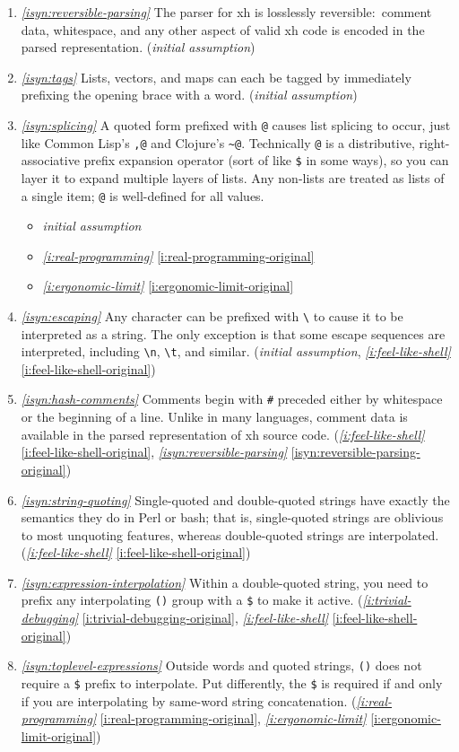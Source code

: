 \documentclass{report}
\makeatletter
\newcommand*{\Label}[2]{%
  \@bsphack
  \begingroup
    \label{#1-original}%
    \def\@currentlabel{#2}%
    \label{#1}%
  \endgroup
  \@esphack
}
\newcommand{\initial}{{\em initial assumption}}
\newcommand{\refboth}[1]{{\em \ref{#1}} \ref{#1-original}}
\makeatother
\begin{document}
\begin{enumerate}
\item{}\Label{isyn:reversible-parsing}{syn.reversibleparsing}{\em\ref{isyn:reversible-parsing}}
  The parser for xh is losslessly reversible:~comment data, whitespace, and
  any other aspect of valid xh code is encoded in the parsed
  representation.
(\initial)
\item{}\Label{isyn:tags}{syn.tags}{\em\ref{isyn:tags}}
  Lists, vectors, and maps can each be tagged by immediately prefixing the
  opening brace with a word.
(\initial)
\item{}\Label{isyn:splicing}{syn.splice}{\em\ref{isyn:splicing}}
  A quoted form prefixed with \verb|@| causes list splicing to occur, just
  like Common Lisp's \verb|,@| and Clojure's \verb|~@|. Technically
  \verb|@| is a distributive, right-associative prefix expansion operator
  (sort of like \verb|$| in some ways), so you can layer it to expand
  multiple layers of lists. Any non-lists are treated as lists of a single
  item; \verb|@| is well-defined for all values.
\begin{itemize}
\item \initial
\item \refboth{i:real-programming}
\item \refboth{i:ergonomic-limit}
\end{itemize}
\item{}\Label{isyn:escaping}{syn.escaping}{\em\ref{isyn:escaping}}
  Any character can be prefixed with {\tt \textbackslash} to cause it to be
  interpreted as a string. The only exception is that some escape sequences
  are interpreted, including \verb|\n|, \verb|\t|, and similar.
(\initial, \refboth{i:feel-like-shell})

\item{}\Label{isyn:hash-comments}{syn.hashcomments}{\em\ref{isyn:hash-comments}}
  Comments begin with \verb|#| preceded either by whitespace or the
  beginning of a line. Unlike in many languages, comment data is available
  in the parsed representation of xh source code.
(\refboth{i:feel-like-shell}, \refboth{isyn:reversible-parsing})
\item{}\Label{isyn:string-quoting}{syn.stringquoting}{\em\ref{isyn:string-quoting}}
  Single-quoted and double-quoted strings have exactly the semantics they
  do in Perl or bash; that is, single-quoted strings are oblivious to most
  unquoting features, whereas double-quoted strings are interpolated.
(\refboth{i:feel-like-shell})
\item{}\Label{isyn:expression-interpolation}{syn.stringexpressions}{\em\ref{isyn:expression-interpolation}}
  Within a double-quoted string, you need to prefix any interpolating
  \verb|()| group with a \verb|$| to make it active.
(\refboth{i:trivial-debugging}, \refboth{i:feel-like-shell})
\item{}\Label{isyn:toplevel-expressions}{syn.toplevelexpressions}{\em\ref{isyn:toplevel-expressions}}
  Outside words and quoted strings, \verb|()| does not require a \verb|$|
  prefix to interpolate. Put differently, the \verb|$| is required if and
  only if you are interpolating by same-word string concatenation.
(\refboth{i:real-programming}, \refboth{i:ergonomic-limit})


\end{enumerate}
\end{document}
